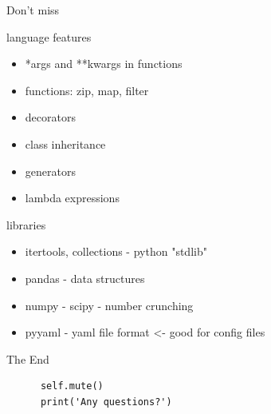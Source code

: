 \documentclass{bredelebeamer}
\begin{document}
\begin{frame}{Don't miss}
  \begin{block}{language features}
  \begin{itemize}
    \item *args and **kwargs in functions
    \item functions: zip, map, filter
    \item decorators
    \item class inheritance
    \item generators
    \item lambda expressions
  \end{itemize}
  \end{block}
  
  \begin{exampleblock}{libraries}
  \begin{itemize}
    \item itertools, collections - python "stdlib"
    \item pandas - data structures
    \item numpy - scipy - number crunching
    \item pyyaml - yaml file format <- good for config files
  \end{itemize}
  \end{exampleblock}
\end{frame}

\begin{frame}[fragile]{The End}
    \begin{lstlisting}
      self.mute()
      print('Any questions?')
    \end{lstlisting}
\end{frame}
\end{document}

